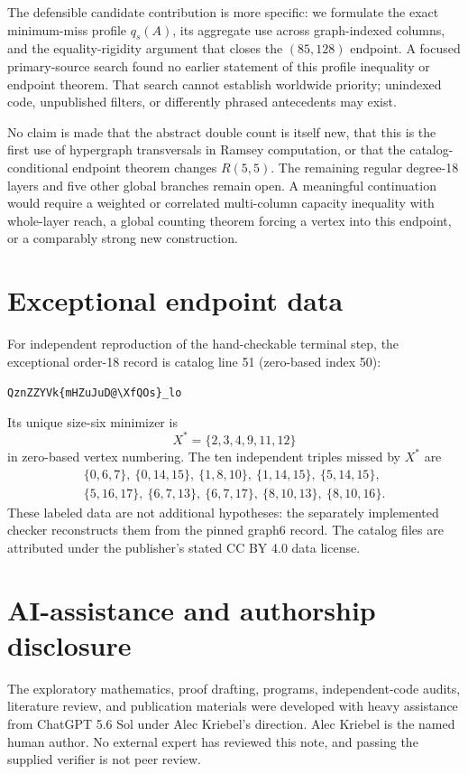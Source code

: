 \documentclass[11pt]{article}
\begin{document}
The defensible candidate contribution is more specific: we formulate the
exact
minimum-miss profile $q_s(A)$, its aggregate use across graph-indexed columns,
and the equality-rigidity argument that closes the $(85,128)$ endpoint.  A
focused primary-source search found no earlier statement of this profile
inequality or endpoint theorem.  That search cannot establish worldwide
priority; unindexed code, unpublished filters, or differently phrased
antecedents may exist.

No claim is made that the abstract double count is itself new, that this is
the first use of hypergraph transversals in Ramsey computation, or that the
catalog-conditional endpoint theorem changes $R(5,5)$.  The remaining regular
degree-18 layers and five other global branches remain open.  A meaningful
continuation would require a weighted or correlated multi-column capacity
inequality with whole-layer reach, a global counting theorem forcing a vertex
into this endpoint, or a comparably strong new construction.

\appendix
\section{Exceptional endpoint data}

For independent reproduction of the hand-checkable terminal step, the
exceptional order-18 record is catalog line 51 (zero-based index 50):
\begin{center}
\verb|QznZZYVk{mHZuJuD@\XfQOs}_lo|
\end{center}
Its unique size-six minimizer is
\[
 X^\ast=\{2,3,4,9,11,12\}
\]
in zero-based vertex numbering.  The ten independent triples missed by
$X^\ast$ are
\[
\begin{gathered}
\{0,6,7\},\ \{0,14,15\},\ \{1,8,10\},\ \{1,14,15\},\
\{5,14,15\},\\
\{5,16,17\},\ \{6,7,13\},\ \{6,7,17\},\
\{8,10,13\},\ \{8,10,16\}.
\end{gathered}
\]
These labeled data are not additional hypotheses: the separately implemented
checker reconstructs them from the pinned graph6 record.  The catalog files
are attributed under the publisher's stated CC BY 4.0 data license.

\section*{AI-assistance and authorship disclosure}

The exploratory mathematics, proof drafting, programs, independent-code
audits, literature review, and publication materials were developed with
heavy assistance from ChatGPT 5.6 Sol under Alec Kriebel's direction.  Alec
Kriebel is the named human author.  No external expert has reviewed this note,
and passing the supplied verifier is not peer review.
\end{document}
